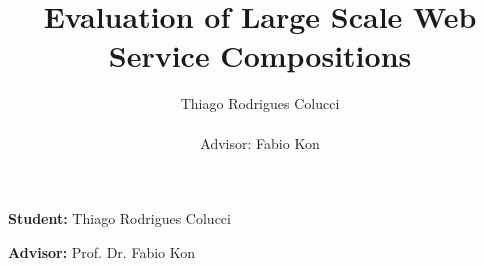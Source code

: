 \documentclass[11pt,a4paper]{article} %
\title{Evaluation of Large Scale Web Service Compositions}
\author{Thiago Rodrigues Colucci\\\\Advisor: Fabio Kon}
\begin{document}
\maketitle

\newpage

\tableofcontents
\newpage
\textbf{Student:} Thiago Rodrigues Colucci

\textbf{Advisor:} Prof. Dr. Fabio Kon



\newpage

\newpage

\newpage

\newpage

\newpage

 
\end{document}
